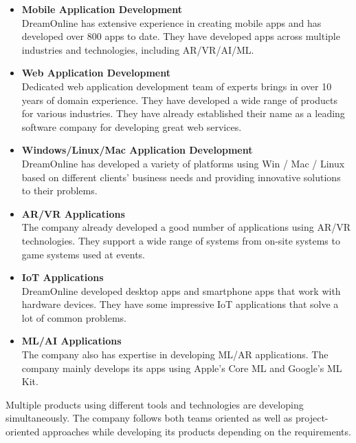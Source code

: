 \begin{flushleft}
\begin{itemize}
    \item \textbf{Mobile Application Development}\\
    \vspace{6pt}
DreamOnline has extensive experience in creating mobile apps and has developed over
800 apps to date. They have developed apps across multiple industries and
technologies, including AR/VR/AI/ML.
\item \textbf{Web Application Development}\\
\vspace{6pt}
Dedicated web application development team of experts brings in over 10 years of
domain experience. They have developed a wide range of products for various
industries. They have already established their name as a leading software company for
developing great web services.
\item \textbf{Windows/Linux/Mac Application Development}\\
\vspace{6pt}
DreamOnline has developed a variety of platforms using Win / Mac / Linux based on
different clients' business needs and providing innovative solutions to their problems.
\item \textbf{AR/VR Applications}\\
\vspace{6pt}
The company already developed a good number of applications using AR/VR
technologies. They support a wide range of systems from on-site systems to game
systems used at events.
\item \textbf{IoT Applications}\\
\vspace{6pt}
DreamOnline developed desktop apps and smartphone apps that work with hardware
devices. They have some impressive IoT applications that solve a lot of common
problems.
\item \textbf{ML/AI Applications}\\
\vspace{6pt}
The company also has expertise in developing ML/AR applications. The company mainly
develops its apps using Apple's Core ML and Google's ML Kit.
\end{itemize}


Multiple products using different tools and technologies are developing simultaneously. The
company follows both teams oriented as well as project-oriented approaches while developing
its products depending on the requirements.

\end{flushleft}





